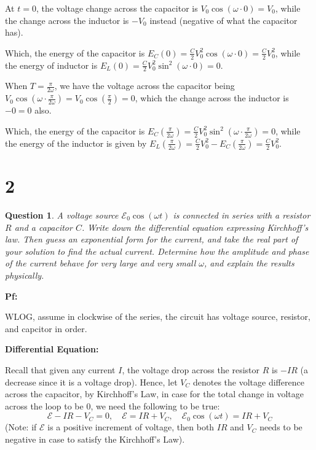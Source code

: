 \documentclass{article}
\newtheorem{question}{Question}
\begin{document}
\hfill

At $t=0$, the voltage change across the capacitor is $V_0\cos(\omega\cdot 0) = V_0$, while the change across the inductor is $-V_0$ instead (negative of what the capacitor has).

Which, the energy of the capacitor is $E_C(0)=\frac{C}{2}V_0^2\cos(\omega \cdot 0) = \frac{C}{2}V_0^2$, while the energy of inductor is $E_L(0)=\frac{C}{2}V_0^2\sin^2(\omega \cdot 0)=0$.

\hfill

When $T=\frac{\pi}{2\omega}$, we have the voltage across the capacitor being $V_0\cos(\omega \cdot \frac{\pi}{2\omega}) = V_0\cos(\frac{\pi}{2})=0$, which the change across the inductor is $-0 = 0$ also.

Which, the energy of the capacitor is $E_C(\frac{\pi}{2\omega}) = \frac{C}{2}V_0^2\sin^2(\omega\cdot \frac{\pi}{2\omega}) = 0$, while the energy of the inductor is given by $E_L(\frac{\pi}{2\omega}) = \frac{C}{2}V_0^2 - E_C(\frac{\pi}{2\omega}) = \frac{C}{2}V_0^2$.

\break

\section*{2}
\begin{myBox}[]{}
    \begin{question}
        A voltage source $\mathcal{E}_0\cos(\omega t)$ is connected in series with a resistor $R$
        and a capacitor $C$. Write down the differential equation expressing
        Kirchhoff's law. Then guess an exponential form for the current,
        and take the real part of your solution to find the actual current.
        Determine how the amplitude and phase of the current behave for
        very large and very small $\omega$, and explain the results physically.
    \end{question}
\end{myBox}

\textbf{Pf:}

WLOG, assume in clockwise of the series, the circuit has voltage source, resistor, and capcitor in order.

\hfill

\textbf{Differential Equation:}

Recall that given any current $I$, the voltage drop across the resistor $R$ is $-IR$ (a decrease since it is a voltage drop). Hence, 
let $V_C$ denotes the voltage difference across the capacitor, by Kirchhoff's Law,
in case for the total change in voltage across the loop to be $0$, we need the following to be true:
$$\mathcal{E}-IR - V_C = 0,\quad \mathcal{E}=IR+V_C,\quad \mathcal{E}_0\cos(\omega t) = IR + V_C$$
(Note: if $\mathcal{E}$ is a positive increment of voltage, then both $IR$ and $V_C$ needs to be negative in case to satisfy the Kirchhoff's Law).
\end{document}
